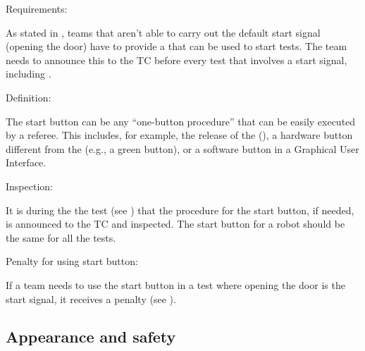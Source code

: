\begin{enumerate}
  {\bf\item Requirements:} As stated in , teams that aren't able to carry out the default start signal
  (opening the door) have to provide a  that can be used to start tests. The team needs to announce this to
  the TC before every test that involves a start signal, including .
  {\bf\item Definition:} The start button can be any ``one-button procedure'' that can be easily executed by a referee.  
  This includes, for example, the release of the  (), 
  a hardware button different from the  (e.g., a green button), or 
  a software button in a Graphical User Interface. 
  {\bf\item Inspection:} It is during the the  test (see ) that the procedure for the start
  button, if needed, is announced to the TC and inspected. The start button for a robot should be the same for all the tests.
  {\bf\item Penalty for using start button:} If a team needs to use the start button 
  in a test where opening the door is the start signal, it receives a penalty (see ).
\end{enumerate}



\subsection{Appearance and safety}\label{rule:roobt_appearance}

